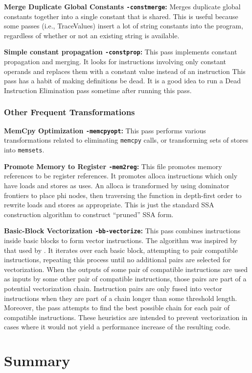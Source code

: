 \noindent\textbf{Merge Duplicate Global Constants \texttt{-constmerge}:}
Merges duplicate global constants together into a single constant that is shared. This is useful because some passes (i.e., TraceValues) insert a lot of string constants into the program, regardless of whether or not an existing string is available.

\noindent\textbf{Simple constant propagation \texttt{-constprop}:}
This pass implements constant propagation and merging.
It looks for instructions involving only constant operands and replaces them with a constant value instead of an instruction
This pass has a habit of making definitions be dead.
It is a good idea to run a Dead Instruction Elimination pass sometime after running this pass.

\subsubsection{Other Frequent Transformations}

\noindent\textbf{MemCpy Optimization \texttt{-memcpyopt}:}
This pass performs various transformations related to eliminating \texttt{memcpy} calls, or transforming sets of stores into \texttt{memsets}.

\noindent\textbf{Promote Memory to Register \texttt{-mem2reg}:}
This file promotes memory references to be register references. It promotes alloca instructions which only have loads and stores as uses. An alloca is transformed by using dominator frontiers to place phi nodes, then traversing the function in depth-first order to rewrite loads and stores as appropriate. This is just the standard SSA construction algorithm to construct “pruned” SSA form.


\noindent\textbf{Basic-Block Vectorization \texttt{-bb-vectorize}:}
This pass combines instructions inside basic blocks to form vector instructions.
The algorithm was inspired by that used by \cite{franchetti05}.
It iterates over each basic block, attempting to pair compatible instructions, repeating this process until no additional pairs are selected for vectorization.
When the outputs of some pair of compatible instructions are used as inputs by some other pair of compatible instructions, those pairs are part of a potential vectorization chain.
Instruction pairs are only fused into vector instructions when they are part of a chain longer than some threshold length.
Moreover, the pass attempts to find the best possible chain for each pair of compatible instructions.
These heuristics are intended to prevent vectorization in cases where it would not yield a performance increase of the resulting code.




\section{Summary}

